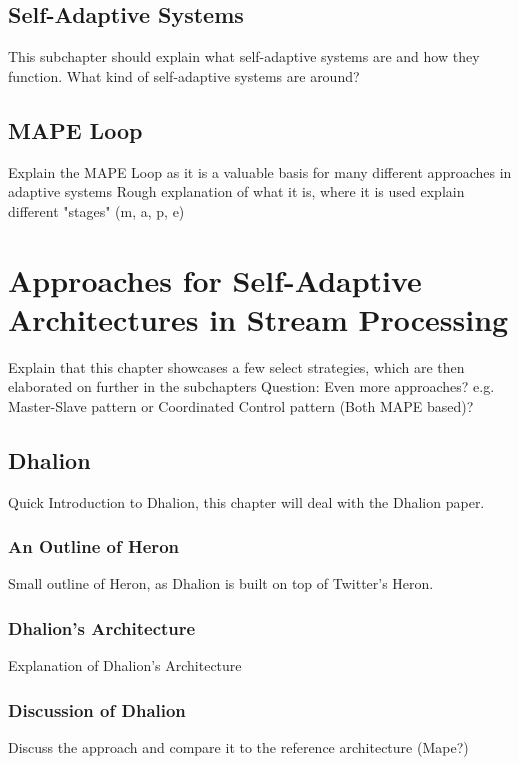     \section{Self-Adaptive Systems}
    This subchapter should explain what self-adaptive systems are and how they function.
    What kind of self-adaptive systems are around?

    \section{MAPE Loop}
    Explain the MAPE Loop as it is a valuable basis for many different approaches in adaptive systems
    Rough explanation of what it is, where it is used
    explain different "stages" (m, a, p, e)


\chapter{Approaches for Self-Adaptive Architectures in Stream Processing}
Explain that this chapter showcases a few select strategies, which are then elaborated on further in the subchapters
Question: Even more approaches? e.g. Master-Slave pattern or Coordinated Control pattern (Both MAPE based)?

    \section{Dhalion}
    Quick Introduction to Dhalion, this chapter will deal with the Dhalion paper.

        \subsection{An Outline of Heron}
        Small outline of Heron, as Dhalion is built on top of Twitter's Heron.

        \subsection{Dhalion's Architecture}
        Explanation of Dhalion's Architecture 

        \subsection{Discussion of Dhalion}
        Discuss the approach and compare it to the reference architecture (Mape?)

